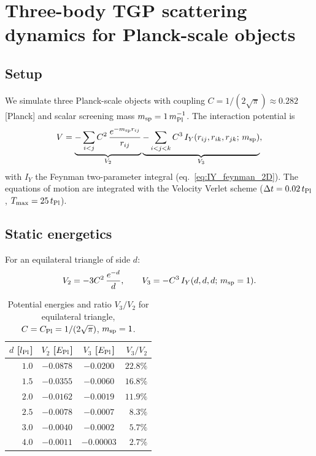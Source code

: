 \section{Three-body TGP scattering dynamics for Planck-scale objects}
\label{sec:scattering}

\subsection{Setup}

We simulate three Planck-scale objects with coupling
$C = 1/(2\sqrt{\pi}) \approx 0.282$ [Planck] and scalar screening mass
$m_{\rm sp}=1\,m_{\rm Pl}^{-1}$.  The interaction potential is
\begin{equation}
  V = \underbrace{-\sum_{i<j} C^2\,\frac{e^{-m_{\rm sp}r_{ij}}}{r_{ij}}}_{V_2}
    \underbrace{-\sum_{i<j<k} C^3\,I_Y(r_{ij},r_{ik},r_{jk};\,m_{\rm sp})}_{V_3},
\end{equation}
with $I_Y$ the Feynman two-parameter integral (eq.~\ref{eq:IY_feynman_2D}).
The equations of motion are integrated with the Velocity Verlet scheme
($\Delta t = 0.02\,t_{\rm Pl}$, $T_{\rm max}=25\,t_{\rm Pl}$).

\subsection{Static energetics}

For an equilateral triangle of side $d$:
\begin{equation}
  V_2 = -3C^2\,\frac{e^{-d}}{d},\qquad
  V_3 = -C^3\,I_Y(d,d,d;\,m_{\rm sp}=1).
\end{equation}

\begin{table}[h]
\centering
\caption{Potential energies and ratio $V_3/V_2$ for equilateral triangle,
$C=C_{\rm Pl}=1/(2\sqrt{\pi})$, $m_{\rm sp}=1$.}
\label{tab:Ep_equilat}
\begin{tabular}{rccr}
\hline
$d$ [$l_{\rm Pl}$] & $V_2$ [$E_{\rm Pl}$] & $V_3$ [$E_{\rm Pl}$] & $V_3/V_2$ \\
\hline
$1.0$ & $-0.0878$ & $-0.0200$ & $22.8\%$ \\
$1.5$ & $-0.0355$ & $-0.0060$ & $16.8\%$ \\
$2.0$ & $-0.0162$ & $-0.0019$ & $11.9\%$ \\
$2.5$ & $-0.0078$ & $-0.0007$ & $ 8.3\%$ \\
$3.0$ & $-0.0040$ & $-0.0002$ & $ 5.7\%$ \\
$4.0$ & $-0.0011$ & $-0.00003$ & $ 2.7\%$ \\
\hline
\end{tabular}
\end{table}

